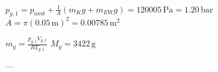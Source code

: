 \( p_{g,1} = p_{amb} + \frac{1}{A}(m_{K} g + m_{EW} g) = 120005 \, \text{Pa} = 1.20 \, \text{bar} \)  
\( A = \pi (0.05 \, \text{m})^2 = 0.00785 \, \text{m}^2 \)  

\( m_{g} = \frac{p_{g,1} V_{g,1}}{R T_{g,1}} \)  
\( M_{g} = 3422 \, \text{g} \)  

---